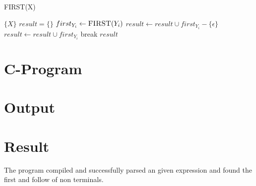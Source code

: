 \begin{algorithm}[H]
	\caption{FIRST(X)}
	\begin{algorithmic}[1]
				\State \Return $\{ X \}$
			\Else {}
				\State $result = \{\}$
					\State $first_{Y_i} \gets \Call{FIRST}{Y_i}$
						\State $result \gets result \cup first_{Y_i} - \{\epsilon\}$
						\State $result \gets result \cup first_{Y_i}$
					\Else
						\State break
					\EndIf
				\EndFor
				\State \Return $result$
			\EndIf
		\EndProcedure
	\end{algorithmic}
\end{algorithm}

\section{C-Program}


\section{Output}



\section{Result}
The program compiled and successfully parsed an given expression and found the first and follow of non terminals.